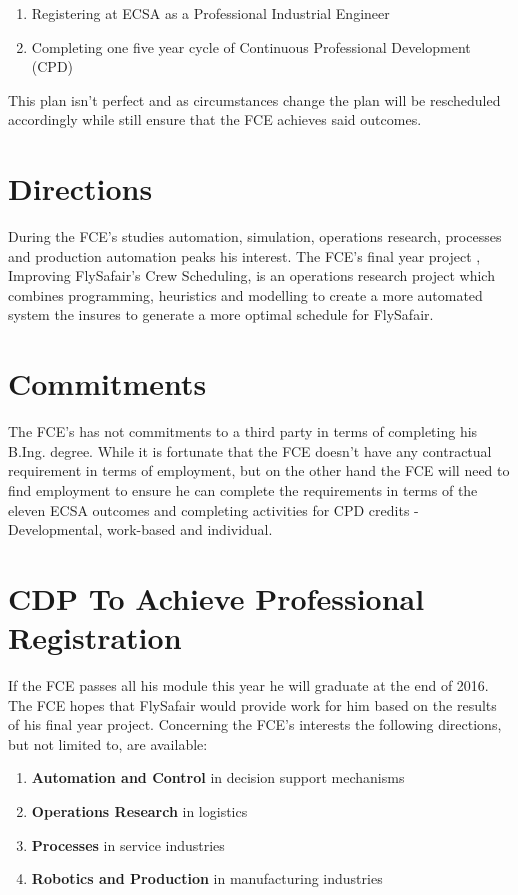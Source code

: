 \documentclass[11pt,a4paper]{article}
\begin{document}
		\begin{enumerate}
		\item	Registering at ECSA as a Professional Industrial Engineer
		
		\item	Completing one five year cycle of Continuous Professional Development (CPD)
		\end{enumerate}
		
		This plan isn't perfect and as circumstances change the plan will be rescheduled accordingly while still ensure that the FCE achieves said outcomes.
		
	\section{Directions}
		During the FCE's studies automation, simulation, operations research, processes and production automation peaks his interest. 
		The FCE's final year project , Improving FlySafair's Crew Scheduling, is an operations research project which combines programming, heuristics and modelling to create a more automated system the insures to generate a more optimal schedule for FlySafair.
		
	
	\section{Commitments}
		The FCE's has not commitments to a third party in terms of completing his B.Ing. degree.
		While it is fortunate that the FCE doesn't have any contractual requirement in terms of employment, but on the other hand the FCE will need to find employment to ensure he can complete the requirements in terms of the eleven ECSA outcomes and completing activities for CPD credits - Developmental, work-based and individual.
	
	\section{CDP To Achieve Professional Registration}
		If the FCE passes all his module this year he will graduate at the end of 2016.
		The FCE hopes that FlySafair would provide work for him based on the results of his final year project.
		Concerning the FCE's interests the following directions, but not limited to, are available:
		
		\begin{enumerate}
		\item	\textbf{Automation and Control} in decision support mechanisms
		
		\item	\textbf{Operations Research} in logistics
		
		\item	\textbf{Processes} in service industries
		
		\item	\textbf{Robotics and Production} in manufacturing industries
		
		\end{enumerate}
		
\end{document}
